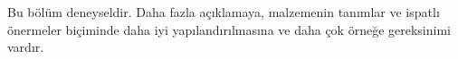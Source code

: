 \documentclass[../../../include/open-logic-chapter]{subfiles}
\begin{document}

\begin{editorial}
  Bu bölüm deneyseldir. Daha fazla açıklamaya, malzemenin tanımlar ve
  ispatlı önermeler biçiminde daha iyi yapılandırılmasına ve daha çok örneğe
  gereksinimi vardır.
\end{editorial}


\OLEndChapterHook
\end{document}
